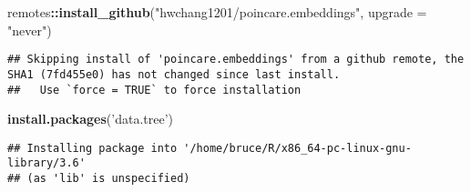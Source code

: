 \documentclass[
  11pt,
]{book}
\newenvironment{Shaded}{\begin{snugshade}}{\end{snugshade}}
\newcommand{\DataTypeTok}[1]{\textcolor[rgb]{0.13,0.29,0.53}{#1}}
\newcommand{\KeywordTok}[1]{\textcolor[rgb]{0.13,0.29,0.53}{\textbf{#1}}}
\newcommand{\NormalTok}[1]{#1}
\newcommand{\OperatorTok}[1]{\textcolor[rgb]{0.81,0.36,0.00}{\textbf{#1}}}
\newcommand{\StringTok}[1]{\textcolor[rgb]{0.31,0.60,0.02}{#1}}
\begin{document}
\begin{Shaded}
\begin{Highlighting}[]
\NormalTok{remotes}\OperatorTok{::}\KeywordTok{install_github}\NormalTok{(}\StringTok{"hwchang1201/poincare.embeddings"}\NormalTok{, }\DataTypeTok{upgrade =} \StringTok{"never"}\NormalTok{)}
\end{Highlighting}
\end{Shaded}

\begin{verbatim}
## Skipping install of 'poincare.embeddings' from a github remote, the SHA1 (7fd455e0) has not changed since last install.
##   Use `force = TRUE` to force installation
\end{verbatim}

\begin{Shaded}
\begin{Highlighting}[]
\KeywordTok{install.packages}\NormalTok{(}\StringTok{'data.tree'}\NormalTok{)}
\end{Highlighting}
\end{Shaded}

\begin{verbatim}
## Installing package into '/home/bruce/R/x86_64-pc-linux-gnu-library/3.6'
## (as 'lib' is unspecified)
\end{verbatim}
\end{document}
